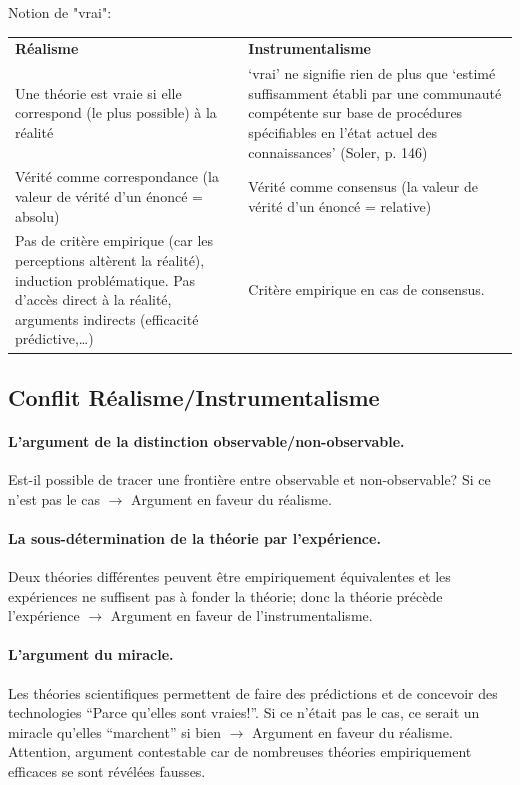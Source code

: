 \documentclass{report}
\begin{document}
	Notion de "vrai":
	\begin{center}
		\begin{tabular}{|p{}|p{}|}
			\hline \textbf{Réalisme} & \textbf{Instrumentalisme}\\
			\hhline{|=|=|} Une théorie est vraie si elle correspond (le plus possible) à la réalité & \og ‘vrai’ ne signifie rien de plus que ‘estimé suffisamment établi par une communauté compétente sur base de procédures spécifiables en l’état actuel des connaissances’ \fg (Soler, p. 146) \\
			\hline Vérité comme correspondance (la valeur de vérité d’un énoncé = absolu) &  Vérité comme consensus (la valeur de vérité d’un énoncé = relative) \\
			\hline Pas de critère empirique (car les perceptions altèrent la réalité), induction problématique. Pas d'accès direct à la réalité, arguments indirects (efficacité prédictive,\dots) & Critère empirique en cas de consensus. \\
			\hline
		\end{tabular}
	\end{center}
	
	\subsection{Conflit Réalisme/Instrumentalisme}
	
	\paragraph{L’argument de la distinction observable/non-observable.} Est-il possible de tracer une frontière entre observable et non-observable? Si ce n’est pas le cas $\rightarrow$ Argument en faveur du réalisme.
	
	\paragraph{La sous-détermination de la théorie par l’expérience.} Deux théories différentes peuvent être empiriquement équivalentes et les expériences ne suffisent pas à fonder la théorie; donc la théorie précède l’expérience $\rightarrow$ Argument en faveur de l’instrumentalisme.
	
	\paragraph{L’argument du miracle.} Les théories scientifiques permettent de faire des prédictions et de concevoir des technologies “Parce qu’elles sont vraies!”. Si ce n’était pas le cas, ce serait un miracle qu’elles “marchent” si bien $\rightarrow$ Argument en faveur du réalisme. Attention, argument contestable car de nombreuses théories empiriquement efficaces se sont révélées fausses.
	
\end{document}
